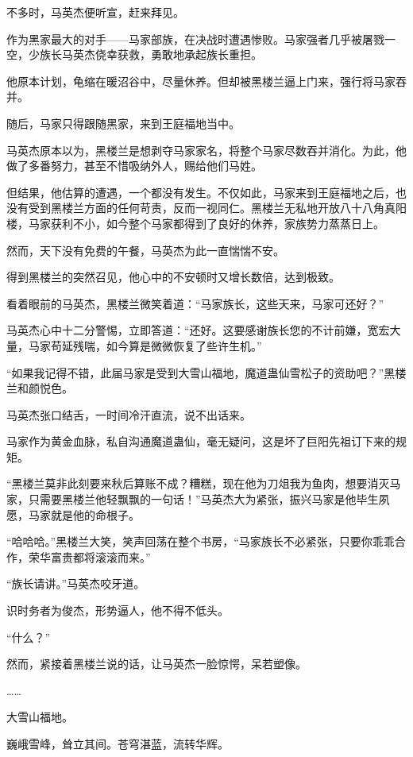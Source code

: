 
\begin{this_body}

不多时，马英杰便听宣，赶来拜见。

作为黑家最大的对手——马家部族，在决战时遭遇惨败。马家强者几乎被屠戮一空，少族长马英杰侥幸获救，勇敢地承起族长重担。

他原本计划，龟缩在暖沼谷中，尽量休养。但却被黑楼兰逼上门来，强行将马家吞并。

随后，马家只得跟随黑家，来到王庭福地当中。

马英杰原本以为，黑楼兰是想剥夺马家家名，将整个马家尽数吞并消化。为此，他做了多番努力，甚至不惜吸纳外人，赐给他们马姓。

但结果，他估算的遭遇，一个都没有发生。不仅如此，马家来到王庭福地之后，也没有受到黑楼兰方面的任何苛责，反而一视同仁。黑楼兰无私地开放八十八角真阳楼，马家获利不小，如今整个马家都得到了良好的休养，家族势力蒸蒸日上。

然而，天下没有免费的午餐，马英杰为此一直惴惴不安。

得到黑楼兰的突然召见，他心中的不安顿时又增长数倍，达到极致。

看着眼前的马英杰，黑楼兰微笑着道：“马家族长，这些天来，马家可还好？”

马英杰心中十二分警惕，立即答道：“还好。这要感谢族长您的不计前嫌，宽宏大量，马家苟延残喘，如今算是微微恢复了些许生机。”

“如果我记得不错，此届马家是受到大雪山福地，魔道蛊仙雪松子的资助吧？”黑楼兰和颜悦色。

马英杰张口结舌，一时间冷汗直流，说不出话来。

马家作为黄金血脉，私自沟通魔道蛊仙，毫无疑问，这是坏了巨阳先祖订下来的规矩。

“黑楼兰莫非此刻要来秋后算账不成？糟糕，现在他为刀俎我为鱼肉，想要消灭马家，只需要黑楼兰他轻飘飘的一句话！”马英杰大为紧张，振兴马家是他毕生夙愿，马家就是他的命根子。

“哈哈哈。”黑楼兰大笑，笑声回荡在整个书房，“马家族长不必紧张，只要你乖乖合作，荣华富贵都将滚滚而来。”

“族长请讲。”马英杰咬牙道。

识时务者为俊杰，形势逼人，他不得不低头。

“什么？”

然而，紧接着黑楼兰说的话，让马英杰一脸惊愕，呆若塑像。

……

大雪山福地。

巍峨雪峰，耸立其间。苍穹湛蓝，流转华辉。


\end{this_body}
